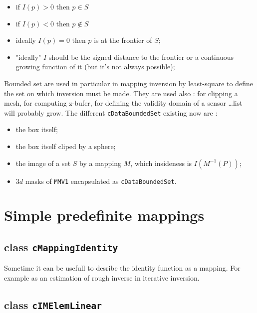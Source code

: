 \begin{itemize}
	\item if $I(p) >0$  then $p \in S $
	\item if $I(p) <0$  then $p \notin S $
	\item  ideally $I(p) =0$   then $p$ is at the frontier of $S$;
	\item  "ideally" $I$ should be the signed distance to the frontier or a continuous
		growing function of it (but it's not always possible);
\end{itemize}

Bounded set are used in particular in mapping inversion
by least-square to define the set on which inversion must be made. 
They are used also : for clipping a mesh, for computing z-bufer,
for defining the validity domain of a sensor  \dots list will probably grow.
The  different  {\tt cDataBoundedSet} existing now are :

\begin{itemize}
	\item  the box itself;
	\item  the box itself cliped by a sphere;
	\item  the image of a set $S$ by a mapping   $M$, which insideness is $I(M^{-1}(P))$;
	\item  $3d$ masks of {\tt MMV1} encapsulated as  {\tt cDataBoundedSet}.
\end{itemize}




\section{Simple predefinite mappings}


\subsection{class {\tt cMappingIdentity}}

Sometime it can be usefull to desribe the identity function as a mapping.
For example as an estimation of rough inverse in iterative inversion.


\subsection{class {\tt cIMElemLinear}}
